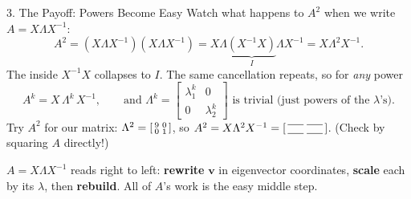 \documentclass[10pt]{article}
\begin{document}
\begin{notesbox}{3. The Payoff: Powers Become Easy}
Watch what happens to $A^2$ when we write $A=X\Lambda X^{-1}$:
\[
  A^2=(X\Lambda X^{-1})(X\Lambda X^{-1})=X\Lambda \underbrace{(X^{-1}X)}_{I}\Lambda X^{-1}
  =X\Lambda^2 X^{-1}.
\]
The inside $X^{-1}X$ collapses to $I$. The same cancellation repeats, so for \emph{any} power
\[
  A^k=X\,\Lambda^k\,X^{-1},\qquad\text{and }\Lambda^k=\begin{bmatrix}\lambda_1^k & 0\\ 0 & \lambda_2^k\end{bmatrix}
  \text{ is trivial (just powers of the }\lambda\text{'s).}
\]
Try $A^2$ for our matrix: $\Lambda^2=\begin{bsmallmatrix}9&0\\0&1\end{bsmallmatrix}$, so
$A^2=X\Lambda^2 X^{-1}=\begin{bsmallmatrix}\blank{0.5cm}&\blank{0.5cm}\\[2pt]\blank{0.5cm}&\blank{0.5cm}\end{bsmallmatrix}$.
(Check by squaring $A$ directly!)

\begin{center}
\end{center}
$A=X\Lambda X^{-1}$ reads right to left: \textbf{rewrite} $\mathbf v$ in eigenvector coordinates, \textbf{scale}
each by its $\lambda$, then \textbf{rebuild}. All of $A$'s work is the easy middle step.
\end{notesbox}
\end{document}
